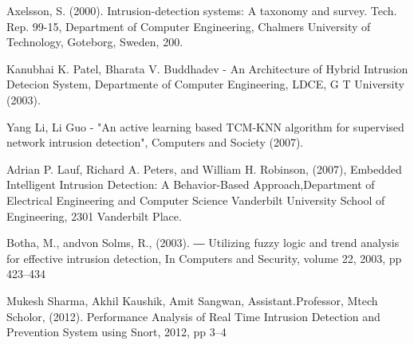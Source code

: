 \documentclass[conference]{IEEEtran}
\begin{document}
\begin{thebibliography}{99}
Axelsson,  S.  (2000).  Intrusion-detection  systems:  A  taxonomy  and  survey.  Tech.  Rep.    99-15,  Department  of Computer Engineering, Chalmers University of Technology, Goteborg, Sweden, 200.

Kanubhai K. Patel, Bharata V. Buddhadev - An Architecture of Hybrid Intrusion Detecion System, Departmente of Computer Engineering, LDCE, G T University (2003).

Yang Li, Li Guo - "An active learning based TCM-KNN algorithm for supervised network intrusion detection", Computers and Society (2007).

Adrian P. Lauf, Richard A. Peters, and William H. Robinson, (2007), Embedded Intelligent Intrusion Detection: A Behavior-Based Approach,Department of Electrical Engineering and Computer Science Vanderbilt University School of Engineering, 2301 Vanderbilt Place.

Botha, M., andvon Solms, R., (2003). ― Utilizing fuzzy logic and trend analysis for effective intrusion detection, In Computers and Security, volume 22, 2003, pp 423–434

Mukesh Sharma, Akhil Kaushik, Amit Sangwan, Assistant.Professor, Mtech Scholor, (2012). Performance Analysis of Real Time Intrusion Detection and Prevention System using Snort, 2012, pp 3–4

\end{thebibliography}
\end{document}

